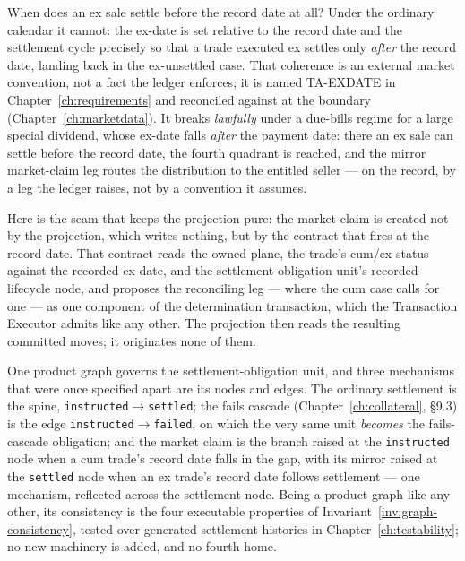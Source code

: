 \documentclass[11pt,a4paper]{article}
\begin{document}
When does an ex sale settle before the record date at all? Under the ordinary calendar
it cannot: the ex-date is set relative to the record date and the settlement cycle
precisely so that a trade executed ex settles only \emph{after} the record date,
landing back in the ex-unsettled case. That coherence is an external market convention,
not a fact the ledger enforces; it is named TA-EXDATE in Chapter~\ref{ch:requirements}
and reconciled against at the boundary (Chapter~\ref{ch:marketdata}). It breaks
\emph{lawfully} under a due-bills regime for a large special dividend, whose ex-date
falls \emph{after} the payment date: there an ex sale can settle before the record
date, the fourth quadrant is reached, and the mirror market-claim leg routes the
distribution to the entitled seller --- on the record, by a leg the ledger raises, not
by a convention it assumes.

Here is the seam that keeps the projection pure: the market claim is created not by the
projection, which writes nothing, but by the contract that fires at the record date.
That contract reads the owned plane, the trade's cum/ex status against the recorded
ex-date, and the settlement-obligation unit's recorded lifecycle node, and proposes the
reconciling leg --- where the cum case calls for one --- as one component of the
determination transaction, which the Transaction Executor admits like any other. The
projection then reads the resulting committed moves; it originates none of them.

One product graph governs the settlement-obligation unit, and three mechanisms that were
once specified apart are its nodes and edges. The ordinary settlement is the spine,
\texttt{instructed}$\to$\texttt{settled}; the fails cascade (Chapter~\ref{ch:collateral},
\S9.3) is the edge \texttt{instructed}$\to$\texttt{failed}, on which the very same unit
\emph{becomes} the fails-cascade obligation; and the market claim is the branch raised at
the \texttt{instructed} node when a cum trade's record date falls in the gap, with its
mirror raised at the \texttt{settled} node when an ex trade's record date follows
settlement --- one mechanism, reflected across the settlement node. Being a product graph
like any other, its consistency is the four executable properties of
Invariant~\ref{inv:graph-consistency}, tested over generated settlement histories in
Chapter~\ref{ch:testability}; no new machinery is added, and no fourth home.
\end{document}
